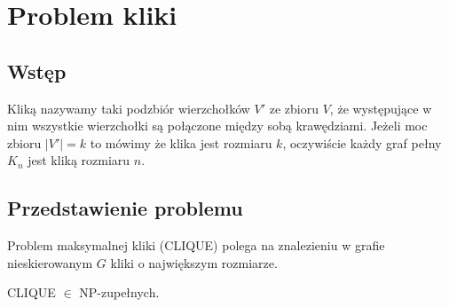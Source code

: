 \chapter{Problem kliki}

\section{Wstęp}

Kliką nazywamy taki podzbiór wierzchołków $V'$ ze zbioru $V$, że występujące w nim wszystkie wierzchołki są połączone między sobą krawędziami. Jeżeli moc zbioru $| V' | = k$  to mówimy że klika jest rozmiaru $k$, oczywiście każdy graf pełny $K_{n}$  jest kliką rozmiaru $n$.

\section{Przedstawienie problemu}

Problem maksymalnej kliki (CLIQUE) polega na znalezieniu w grafie nieskierowanym $G$ kliki o największym rozmiarze.


\begin{twr}
CLIQUE $\in$ NP-zupełnych.
\end{twr}


